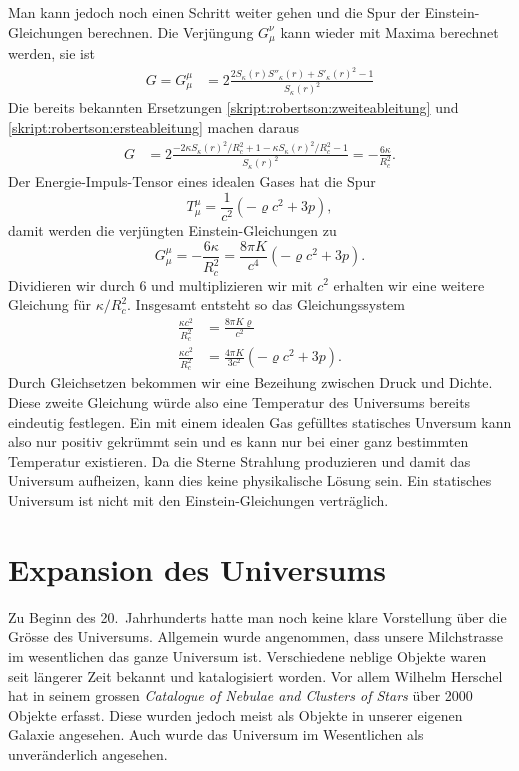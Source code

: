 Man kann jedoch noch einen Schritt weiter gehen und die Spur der
Einstein-Gleichungen berechnen.
Die Verjüngung $G_\mu^\nu$ kann wieder mit Maxima berechnet werden,
sie ist
\begin{align*}
G=G_\mu^\mu
&=
2\frac{2S_\kappa(r)S''_\kappa(r) + S'_\kappa(r)^2-1}{S_\kappa(r)^2}
\end{align*}
Die bereits bekannten Ersetzungen
\eqref{skript:robertson:zweiteableitung}
und
\eqref{skript:robertson:ersteableitung}
machen daraus
\begin{align*}
G
&=
2\frac{-2\kappa S_\kappa(r)^2/R_c^2 + 1-\kappa S_\kappa(r)^2/R_c^2-1}{S_\kappa(r)^2}
=
-\frac{6\kappa}{R_c^2}.
\end{align*}
Der Energie-Impuls-Tensor eines idealen Gases hat die Spur
\[
T_\mu^\mu
=
\frac1{c^2}(-\varrho c^2+3p),
\]
damit werden die verjüngten Einstein-Gleichungen zu
\[
G_\mu^\mu
=
-\frac{6\kappa}{R_c^2}
=
\frac{8\pi K}{c^4}(-\varrho c^2 + 3p).
\]
Dividieren wir durch 6 und multiplizieren wir mit $c^2$ erhalten
wir eine weitere Gleichung für $\kappa/R_c^2$.
Insgesamt entsteht so das Gleichungssystem
\begin{align*}
\frac{\kappa c^2}{R_c^2}
&=
\frac{8\pi K\varrho}{c^2}
\\
\frac{\kappa c^2}{R_c^2}
&=
\frac{4\pi K}{3c^2}(-\varrho c^2 + 3p).
\end{align*}
Durch Gleichsetzen bekommen wir eine Bezeihung zwischen Druck und
Dichte.
Diese zweite Gleichung würde also eine Temperatur des Universums 
bereits eindeutig festlegen.
Ein mit einem idealen Gas gefülltes statisches Unversum kann also
nur positiv gekrümmt sein und es kann
nur bei einer ganz bestimmten Temperatur existieren.
Da die Sterne Strahlung produzieren
und damit das Universum aufheizen, kann dies keine physikalische
Lösung sein.
Ein statisches Universum ist nicht mit den Einstein-Gleichungen
verträglich.

\section{Expansion des Universums}
Zu Beginn des 20.~Jahrhunderts hatte man noch keine klare Vorstellung
über die Grösse des Universums.
Allgemein wurde angenommen, dass unsere Milchstrasse im wesentlichen das
ganze Universum ist.
Verschiedene neblige Objekte waren seit längerer Zeit bekannt und
katalogisiert worden.
Vor allem Wilhelm Herschel hat in seinem grossen 
%
{\em Catalogue of Nebulae and Clusters of Stars} über 2000 Objekte
%
erfasst.
Diese wurden jedoch meist als Objekte in unserer eigenen Galaxie angesehen.
Auch wurde das Universum im Wesentlichen als unveränderlich angesehen.

